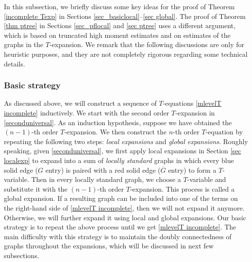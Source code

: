 \documentclass{article}
\newcommand{\1}{\mathds{1}}
\numberwithin{equation}{section}
\newcommand{\fa}{{\mathfrak a}}
\newcommand{\fb}{{\mathfrak b}}
\theoremstyle{plain} %
\theoremstyle{remark}
\newcommand{\cor}{\color{red}}
\newcommand{\incomp}{{\text{$T$-equation}}}
\newcommand{\AT}{\mathcal A_T}
\newcommand{\hty}[1]{{\cor (ht: #1) }}
\begin{document}
In this subsection, we briefly discuss some key ideas for the proof of Theorem \ref{incomplete Texp} in Sections \ref{sec_basiclocal}--\ref{sec global}. The proof of Theorem \ref{thm ptree} in Sections \ref{sec_pflocal} and \ref{sec ptree} uses a different argument, which is based on truncated high moment estimates and on estimates of the graphs in the $T$-expansion. We remark that the following discussions are only for heuristic purposes, and they are not completely rigorous regarding some technical details. %

\subsubsection{Basic strategy} %

As discussed above, we will construct a sequence of $\incomp$s \eqref{mlevelT incomplete} inductively. We start with the second order $T$-expansion in \eqref{seconduniversal}. As an induction hypothesis, suppose we have obtained the $(n -1)$-th order $T$-expansion.
We then construct the $n$-th order $\incomp$ by repeating the following two steps: \emph{local expansions} and \emph{global expansions}. Roughly speaking, given \eqref{seconduniversal}, we first apply local expansions in Section \ref{sec localexp} to expand \smash{$\AT^{(>2)}$} into a sum of \emph{locally standard} graphs in which every blue solid edge ($G$ entry) is paired with a red solid edge ($\overline G$ entry) to form a $T$-variable.  
Then in every locally standard graph, we choose a $T$-variable and substitute it with the $(n-1)$-th order $T$-expansion. This process is called a global expansion. If a resulting graph can be included into one of the terms on the right-hand side of \eqref{mlevelT incomplete}, then we will not expand it anymore. Otherwise, we will further expand it using local and global expansions. Our basic strategy is to repeat the above process until we get \eqref{mlevelT incomplete}. The main difficulty with this strategy is to maintain the doubly connectedness of graphs throughout the expansions, which will be discussed in next few subsections.   
\end{document}
